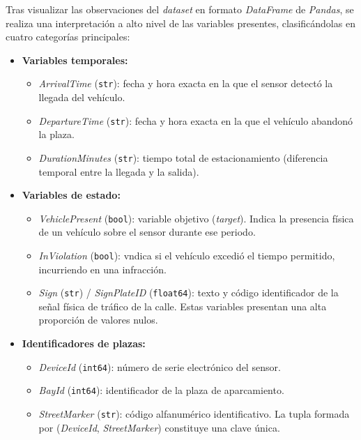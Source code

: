 Tras visualizar las observaciones del \textit{dataset} en formato \textit{DataFrame} de \textit{Pandas}, se realiza una interpretación a alto nivel de las variables presentes, clasificándolas en cuatro categorías principales:

\begin{itemize}
	\item \textbf{Variables temporales:}
	\begin{itemize}
		\item \textit{ArrivalTime} (\texttt{str}): fecha y hora exacta en la que el sensor detectó la llegada del vehículo.
		\item \textit{DepartureTime} (\texttt{str}): fecha y hora exacta en la que el vehículo abandonó la plaza.
		\item \textit{DurationMinutes} (\texttt{str}): tiempo total de estacionamiento (diferencia temporal entre la llegada y la salida).
	\end{itemize}
	
	\item \textbf{Variables de estado:}
	\begin{itemize}
		\item \textit{VehiclePresent} (\texttt{bool}): variable objetivo (\textit{target}). Indica la presencia física de un vehículo sobre el sensor durante ese periodo.
		\item \textit{InViolation} (\texttt{bool}): vndica si el vehículo excedió el tiempo permitido, incurriendo en una infracción.
		\item \textit{Sign} (\texttt{str}) / \textit{SignPlateID} (\texttt{float64}): texto y código identificador de la señal física de tráfico de la calle. Estas variables presentan una alta proporción de valores nulos.
	\end{itemize}
	
	\item \textbf{Identificadores de plazas:}
	\begin{itemize}
		\item \textit{DeviceId} (\texttt{int64}): número de serie electrónico del sensor.
		\item \textit{BayId} (\texttt{int64}): identificador de la plaza de aparcamiento.
		\item \textit{StreetMarker} (\texttt{str}): código alfanumérico identificativo. La tupla formada por (\textit{DeviceId}, \textit{StreetMarker}) constituye una clave única.
	\end{itemize}
	

\end{itemize}
